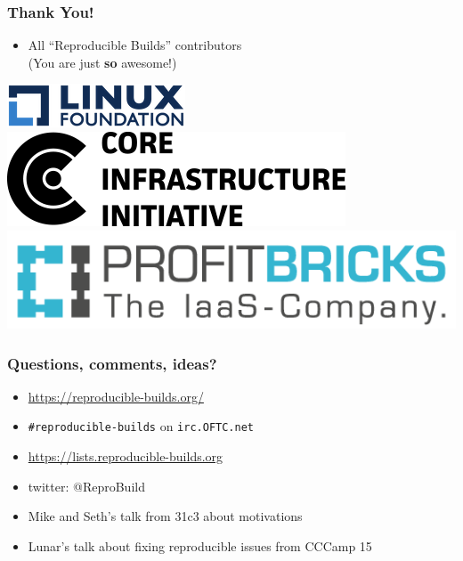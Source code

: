 \documentclass[14pt]{beamer}
\newif\ifplacelogo
\begin{document}
\begin{frame}
 \frametitle{Thank You!}

 \begin{itemize}
  \item
    {All “Reproducible Builds” contributors \\
        {\small (You are just \textbf{so} awesome!)}}

\end{itemize}

 \begin{center}
  \includegraphics[height=0.08\paperheight]{images/linux_foundation_logo.png}
  \hspace{0.05\paperwidth}
  \includegraphics[height=0.08\paperheight]{images/cii_logo.png}
  \hspace{0.05\paperwidth}
  \includegraphics[height=0.08\paperheight]{images/profitbricks_logo.png}
 \end{center}

 \vfill
 \begin{center}
 \end{center}
\end{frame}

\placelogofalse

\begin{frame}
 \frametitle{Questions, comments, ideas?}

 \begin{itemize}
  \item \url{https://reproducible-builds.org/}
  \item \texttt{\#reproducible-builds} on \texttt{irc.OFTC.net}
  \item \url{https://lists.reproducible-builds.org}
  \item twitter: @ReproBuild
  \item<2> Mike and Seth's talk from 31c3 about motivations
  \item<2> Lunar's talk about fixing reproducible issues from CCCamp 15
  \end{itemize}
\end{frame}
\end{document}
